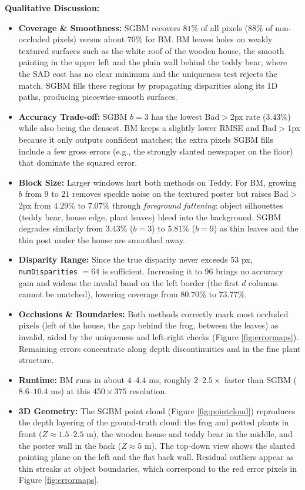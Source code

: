 \documentclass[a4paper,12pt]{article}
\begin{document}
\textbf{Qualitative Discussion:}
\begin{itemize}
    \item \textbf{Coverage \& Smoothness:} SGBM recovers $81\%$ of all pixels ($88\%$ of non-occluded pixels) versus about $70\%$ for BM. BM leaves holes on weakly textured surfaces such as the white roof of the wooden house, the smooth painting in the upper left and the plain wall behind the teddy bear, where the SAD cost has no clear minimum and the uniqueness test rejects the match. SGBM fills these regions by propagating disparities along its 1D paths, producing piecewise-smooth surfaces.
    \item \textbf{Accuracy Trade-off:} SGBM $b=3$ has the lowest Bad$>$2px rate ($3.43\%$) while also being the densest. BM keeps a slightly lower RMSE and Bad$>$1px because it only outputs confident matches; the extra pixels SGBM fills include a few gross errors (e.g., the strongly slanted newspaper on the floor) that dominate the squared error.
    \item \textbf{Block Size:} Larger windows hurt both methods on Teddy. For BM, growing $b$ from $9$ to $21$ removes speckle noise on the textured poster but raises Bad$>$2px from $4.29\%$ to $7.07\%$ through \emph{foreground fattening}: object silhouettes (teddy bear, house edge, plant leaves) bleed into the background. SGBM degrades similarly from $3.43\%$ ($b=3$) to $5.81\%$ ($b=9$) as thin leaves and the thin post under the house are smoothed away.
    \item \textbf{Disparity Range:} Since the true disparity never exceeds $53$ px, \texttt{numDisparities} $=64$ is sufficient. Increasing it to $96$ brings no accuracy gain and widens the invalid band on the left border (the first $d$ columns cannot be matched), lowering coverage from $80.70\%$ to $73.77\%$.
    \item \textbf{Occlusions \& Boundaries:} Both methods correctly mark most occluded pixels (left of the house, the gap behind the frog, between the leaves) as invalid, aided by the uniqueness and left-right checks (Figure \ref{fig:errormaps}). Remaining errors concentrate along depth discontinuities and in the fine plant structure.
    \item \textbf{Runtime:} BM runs in about $4$--$4.4$ ms, roughly $2$--$2.5\times$ faster than SGBM ($8.6$--$10.4$ ms) at this $450\times 375$ resolution.
    \item \textbf{3D Geometry:} The SGBM point cloud (Figure \ref{fig:pointcloud}) reproduces the depth layering of the ground-truth cloud: the frog and potted plants in front ($Z \approx 1.5$--$2.5$ m), the wooden house and teddy bear in the middle, and the poster wall in the back ($Z \approx 5$ m). The top-down view shows the slanted painting plane on the left and the flat back wall. Residual outliers appear as thin streaks at object boundaries, which correspond to the red error pixels in Figure \ref{fig:errormaps}.
\end{itemize}
\end{document}

